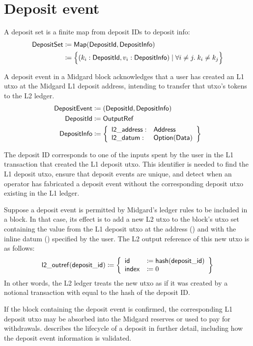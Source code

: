 \documentclass[../midgard.tex]{subfiles}
\begin{document}
\section{Deposit event}
\label{h:deposit-event}

A deposit set is a finite map from deposit IDs to deposit info:
\begin{align*}
    \mathsf{DepositSet} &\coloneq \mathsf{Map(DepositId, DepositInfo)} \\
      &\coloneq \Bigl\{
        (k_i: \mathsf{DepositId}, v_i: \mathsf{DepositInfo}) \mid \forall i \neq j.\; k_i \neq k_j
    \Bigr\}
\end{align*}

A deposit event in a Midgard block acknowledges that a user has created an L1 utxo at the Midgard L1 deposit address, intending to transfer that utxo's tokens to the L2 ledger.
\begin{align*}
    \mathsf{DepositEvent} &\coloneq (\mathsf{DepositId}, \mathsf{DepositInfo}) \\
    \mathsf{DepositId} &\coloneq \mathsf{OutputRef} \\
    \mathsf{DepositInfo} &\coloneq \left\{
        \begin{array}{ll}
            \mathsf{l2\_address} : & \mathsf{Address} \\
            \mathsf{l2\_datum} : & \mathsf{Option(Data)} \\
        \end{array} \right\}
\end{align*}

The deposit ID corresponds to one of the inputs spent by the user in the L1 transaction that created the L1 deposit utxo.
This identifier is needed to find the L1 deposit utxo, ensure that deposit events are unique, and detect when an operator has fabricated a deposit event without the corresponding deposit utxo existing in the L1 ledger.

Suppose a deposit event is permitted by Midgard's ledger rules to be included in a block.
In that case, its effect is to add a new L2 utxo to the block's utxo set containing the value from the L1 deposit utxo at the address () and with the inline datum () specified by the user.
The L2 output reference of this new utxo is as follows: 
\begin{equation*}
    \mathsf{l2\_outref(deposit\_id)} \coloneq \left\{
    \begin{array}{ll}
        \mathsf{id} &\coloneq \mathsf{hash(deposit\_id)} \\
        \mathsf{index} &\coloneq 0
    \end{array} \right\}
\end{equation*}
In other words, the L2 ledger treats the new utxo as if it was created by a notional transaction with  equal to the hash of the deposit ID.

If the block containing the deposit event is confirmed, the corresponding L1 deposit utxo may be absorbed into the Midgard reserves or used to pay for withdrawals.
 describes the lifecycle of a deposit in further detail, including how the deposit event information is validated.
\end{document}
